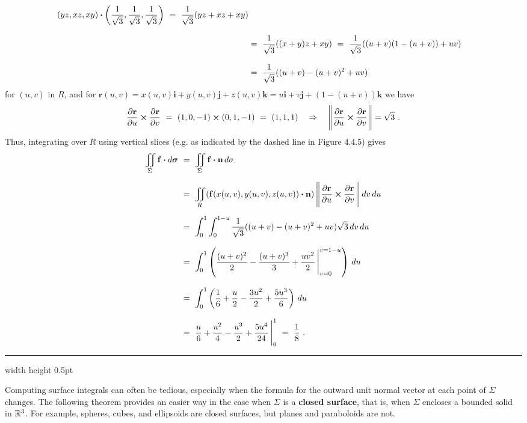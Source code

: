 \begin{exmp}
\begin{align*}
   (yz,xz,xy) \bm{\cdot} \left( \frac{1}{\sqrt{3}},\frac{1}{\sqrt{3}},\frac{1}{\sqrt{3}} \right)
   ~=~ \frac{1}{\sqrt{3}}(yz+xz+xy)\\[8pt]
   &=~ \frac{1}{\sqrt{3}}((x+y)z+xy)
   ~=~ \frac{1}{\sqrt{3}}((u+v)(1-(u+v))+uv)\\[8pt]
   &=~ \frac{1}{\sqrt{3}}((u+v)- (u+v)^2 + uv)
 \end{align*}
 for $(u,v)$ in $R$, and for $\mathbf{r}(u,v)=x(u,v)\mathbf{i} + y(u,v)\mathbf{j} + z(u,v)\mathbf{k} = u\mathbf{i} +
 v\mathbf{j} + (1-(u+v))\mathbf{k}$ we have
 \begin{displaymath}
  \frac{\partial \mathbf{r}}{\partial u} \bm{\times} \frac{\partial \mathbf{r}}{\partial v} ~=~
   (1,0,-1) \bm{\times} (0,1,-1) ~=~ (1,1,1) \quad\Rightarrow\quad
   \Biggl\lVert\mspace{1mu}\frac{\partial \mathbf{r}}{\partial u} \bm{\times} \frac{\partial \mathbf{r}}{\partial v}\mspace{1mu}\Biggr\rVert = \sqrt{3}~.
 \end{displaymath}
 Thus, integrating over $R$ using vertical slices (e.g. as indicated by the dashed line in Figure 4.4.5) gives
 \begin{align*}
  \iint\limits_{\Sigma} \mathbf{f} \bm{\cdot} d\bm{\sigma} ~&=~
   \iint\limits_{\Sigma} \mathbf{f} \bm{\cdot} \mathbf{n}\,d\sigma\\[6pt]
   &=~ \iint\limits_{R} (\mathbf{f}(x(u,v),y(u,v),z(u,v)) \bm{\cdot} \mathbf{n})\,
    \Biggl\lVert\mspace{1mu}\frac{\partial \mathbf{r}}{\partial u} \bm{\times} \frac{\partial \mathbf{r}}{\partial v}\mspace{1mu}\Biggr\rVert\,dv\,du\\[6pt]
   &=~ \int_0^1 \int_0^{1-u} \frac{1}{\sqrt{3}}((u+v)- (u+v)^2 + uv) \sqrt{3}\,dv\,du\\[8pt]
   &=~ \int_0^1 \left( \frac{(u+v)^2}{2} - \frac{(u+v)^3}{3} + \frac{uv^2}{2}\,\Bigg|_{v=0}^{v=1-u} \right)\,du\\[8pt]
   &=~ \int_0^1 \left( \frac{1}{6} + \frac{u}{2} - \frac{3u^2}{2} + \frac{5u^3}{6} \right)\,du\\[8pt]
   &=~ \frac{u}{6} + \frac{u^2}{4} - \frac{u^3}{2} + \frac{5u^4}{24}\,\Bigg|_0^1 ~=~ \frac{1}{8}~.
 \end{align*}
\end{exmp}
\hrule width \textwidth height 0.5pt
\medskip

Computing surface integrals can often be tedious, especially when the formula for the outward unit normal vector at each point of $\Sigma$ changes. 
The following theorem provides an easier way in the case
when $\Sigma$ is a \textbf{closed surface}, that is, when $\Sigma$ encloses a bounded solid in $\mathbb{R}^{3}$. For example,
spheres, cubes, and ellipsoids are closed surfaces, but planes and paraboloids are not.

